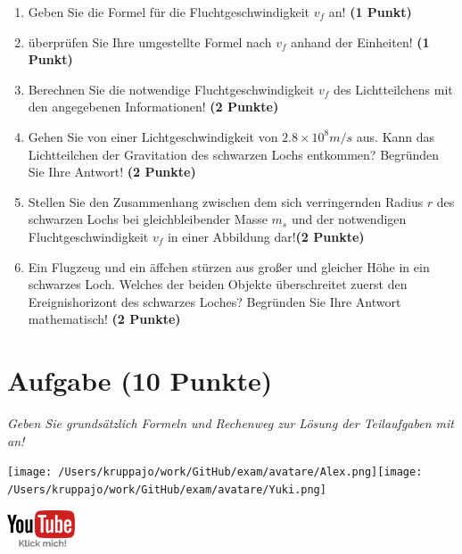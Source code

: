 \documentclass[a4paper, 9pt]{scrartcl}\usepackage[]{graphicx}\usepackage[]{xcolor}
\begin{document}
\begin{enumerate}
\item Geben Sie die Formel für die Fluchtgeschwindigkeit $v_f$ an! \textbf{(1 Punkt)}
\item überprüfen Sie Ihre umgestellte Formel nach $v_f$ anhand der Einheiten! \textbf{(1 Punkt)} 
\item Berechnen Sie die notwendige Fluchtgeschwindigkeit $v_f$ des Lichtteilchens mit den angegebenen Informationen! \textbf{(2 Punkte)}
\item Gehen Sie von einer Lichtgeschwindigkeit von $\ensuremath{2.8\times 10^{8}}m/s$ aus. Kann das Lichtteilchen der Gravitation des schwarzen Lochs entkommen? Begründen Sie Ihre Antwort! \textbf{(2 Punkte)}
\item Stellen Sie den Zusammenhang zwischen dem sich verringernden Radius $r$ des schwarzen Lochs bei gleichbleibender Masse $m_s$ und der notwendigen Fluchtgeschwindigkeit $v_f$ in einer Abbildung dar!\textbf{(2 Punkte)}
 \item Ein Flugzeug und ein äffchen stürzen aus großer und gleicher Höhe in ein schwarzes Loch. Welches der beiden Objekte überschreitet zuerst den Ereignishorizont des schwarzes Loches? Begründen Sie Ihre Antwort mathematisch! \textbf{(2 Punkte)}  
\end{enumerate}

 
\clearpage

\section{Aufgabe \hfill (10 Punkte)}

\textit{Geben Sie grundsätzlich Formeln und Rechenweg zur Lösung der Teilaufgaben mit an!} \\[1Ex]
 

 
\begin{minipage}[t]{0.5\textwidth}
\texttt{[image: /Users/kruppajo/work/GitHub/exam/avatare/Alex.png]}\hspace{-4mm}\texttt{[image: /Users/kruppajo/work/GitHub/exam/avatare/Yuki.png]}
\end{minipage}
\begin{minipage}[t]{0.5\textwidth}
\hfill
\href{https://youtu.be/iCQogS6KhPM}{\includegraphics[width = 2cm]{img/youtube}}
\end{minipage}
\end{document}
